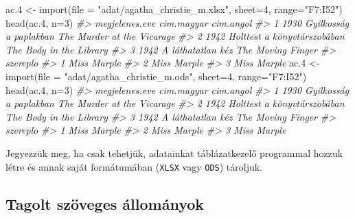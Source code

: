 \documentclass[
]{book}
\newenvironment{Shaded}{\begin{snugshade}}{\end{snugshade}}
\newcommand{\AttributeTok}[1]{\textcolor[rgb]{0.77,0.63,0.00}{#1}}
\newcommand{\CommentTok}[1]{\textcolor[rgb]{0.56,0.35,0.01}{\textit{#1}}}
\newcommand{\DecValTok}[1]{\textcolor[rgb]{0.00,0.00,0.81}{#1}}
\newcommand{\FloatTok}[1]{\textcolor[rgb]{0.00,0.00,0.81}{#1}}
\newcommand{\FunctionTok}[1]{\textcolor[rgb]{0.00,0.00,0.00}{#1}}
\newcommand{\NormalTok}[1]{#1}
\newcommand{\OtherTok}[1]{\textcolor[rgb]{0.56,0.35,0.01}{#1}}
\newcommand{\StringTok}[1]{\textcolor[rgb]{0.31,0.60,0.02}{#1}}
\begin{document}
\begin{Shaded}
\begin{Highlighting}[]
\NormalTok{ac}\FloatTok{.4} \OtherTok{\textless{}{-}} \FunctionTok{import}\NormalTok{(}\AttributeTok{file =} \StringTok{"adat/agatha\_christie\_m.xlsx"}\NormalTok{, }\AttributeTok{sheet=}\DecValTok{4}\NormalTok{, }\AttributeTok{range=}\StringTok{"F7:I52"}\NormalTok{)}
\FunctionTok{head}\NormalTok{(ac}\FloatTok{.4}\NormalTok{, }\AttributeTok{n=}\DecValTok{3}\NormalTok{)}
\CommentTok{\#\textgreater{}   megjelenes.eve                  cim.magyar                  cim.angol}
\CommentTok{\#\textgreater{} 1           1930      Gyilkosság a paplakban The Murder at the Vicarage}
\CommentTok{\#\textgreater{} 2           1942 Holttest a könyvtárszobában    The Body in the Library}
\CommentTok{\#\textgreater{} 3           1942           A láthatatlan kéz          The Moving Finger}
\CommentTok{\#\textgreater{}      szereplo}
\CommentTok{\#\textgreater{} 1 Miss Marple}
\CommentTok{\#\textgreater{} 2 Miss Marple}
\CommentTok{\#\textgreater{} 3 Miss Marple}
\NormalTok{ac}\FloatTok{.4} \OtherTok{\textless{}{-}} \FunctionTok{import}\NormalTok{(}\AttributeTok{file =} \StringTok{"adat/agatha\_christie\_m.ods"}\NormalTok{, }\AttributeTok{sheet=}\DecValTok{4}\NormalTok{, }\AttributeTok{range=}\StringTok{"F7:I52"}\NormalTok{)}
\FunctionTok{head}\NormalTok{(ac}\FloatTok{.4}\NormalTok{, }\AttributeTok{n=}\DecValTok{3}\NormalTok{)}
\CommentTok{\#\textgreater{}   megjelenes.eve                  cim.magyar                  cim.angol}
\CommentTok{\#\textgreater{} 1           1930      Gyilkosság a paplakban The Murder at the Vicarage}
\CommentTok{\#\textgreater{} 2           1942 Holttest a könyvtárszobában    The Body in the Library}
\CommentTok{\#\textgreater{} 3           1942           A láthatatlan kéz          The Moving Finger}
\CommentTok{\#\textgreater{}      szereplo}
\CommentTok{\#\textgreater{} 1 Miss Marple}
\CommentTok{\#\textgreater{} 2 Miss Marple}
\CommentTok{\#\textgreater{} 3 Miss Marple}
\end{Highlighting}
\end{Shaded}

Jegyezzük meg, ha csak tehetjük, adatainkat táblázatkezelő programmal hozzuk létre és annak saját formátumában (\texttt{XLSX} vagy \texttt{ODS}) tároljuk.

\hypertarget{tagolt-szuxf6veges-uxe1llomuxe1nyok}{%
\subsection{Tagolt szöveges állományok}\label{tagolt-szuxf6veges-uxe1llomuxe1nyok}}
\end{document}
